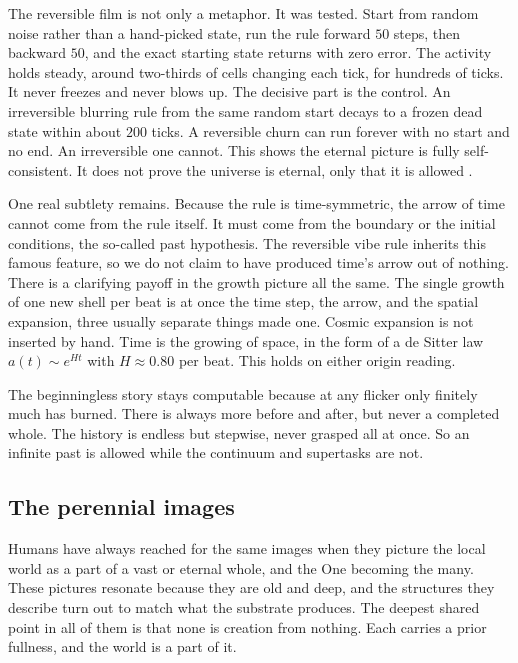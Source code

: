 The reversible film is not only a metaphor. It was tested. Start from random noise rather than a hand-picked
state, run the rule forward $50$ steps, then backward $50$, and the exact starting state returns with zero error.
The activity holds steady, around two-thirds of cells changing each tick, for hundreds of ticks. It never freezes
and never blows up. The decisive part is the control. An irreversible blurring rule from the same random start
decays to a frozen dead state within about $200$ ticks. A reversible churn can run forever with no start and no
end. An irreversible one cannot. This shows the eternal picture is fully self-consistent. It does not prove the
universe is eternal, only that it is allowed \cite{pollard2026vibetest}.

One real subtlety remains. Because the rule is time-symmetric, the arrow of time cannot come from the rule
itself. It must come from the boundary or the initial conditions, the so-called past hypothesis. The reversible
vibe rule inherits this famous feature, so we do not claim to have produced time's arrow out of nothing. There is
a clarifying payoff in the growth picture all the same. The single growth of one new shell per beat is at once the
time step, the arrow, and the spatial expansion, three usually separate things made one. Cosmic expansion is not
inserted by hand. Time is the growing of space, in the form of a de Sitter law $a(t) \sim e^{Ht}$ with $H \approx
0.80$ per beat. This holds on either origin reading.

The beginningless story stays computable because at any flicker only finitely much has burned. There is always
more before and after, but never a completed whole. The history is endless but stepwise, never grasped all at
once. So an infinite past is allowed while the continuum and supertasks are not.

\subsection{The perennial images}

Humans have always reached for the same images when they picture the local world as a part of a vast or eternal
whole, and the One becoming the many. These pictures resonate because they are old and deep, and the structures
they describe turn out to match what the substrate produces. The deepest shared point in all of them is that none
is creation from nothing. Each carries a prior fullness, and the world is a part of it.

